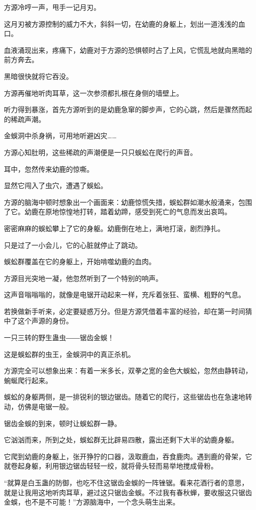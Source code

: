 \begin{this_body}
方源冷哼一声，甩手一记月刃。

这月刃被方源控制的威力不大，斜斜一切，在幼鹿的身躯上，划出一道浅浅的血口。

血液涌现出来，疼痛下，幼鹿对于方源的恐惧顿时占了上风，它慌乱地就向黑暗的前方奔去。

黑暗很快就将它吞没。

方源再催地听肉耳草，这一次参须都扎根在身侧的墙壁上。

听力得到暴涨，首先方源听到的是幼鹿急窜的脚步声，它的心跳，然后是骤然而起的稀疏声潮。

金蜈洞中杀身祸，可用地听避凶灾……

方源心知肚明，这些稀疏的声潮便是一只只蜈蚣在爬行的声音。

耳中，忽然传来幼鹿的惊嘶。

显然它闯入了虫穴，遭遇了蜈蚣。

方源的脑海中顿时想象出一个画面来：幼鹿惊慌失措，蜈蚣群如潮水般涌来，包围了它。幼鹿在原地惊惶地打转，踏着幼蹄，感受到死亡的气息而发出哀鸣。

密密麻麻的蜈蚣攀上了它的身躯。幼鹿倒在地上，满地打滚，剧烈挣扎。

只是过了一小会儿，它的心脏就停止了跳动。

蜈蚣群覆盖在它的身躯上，开始啃噬幼鹿的血肉。

方源目光突地一凝，他忽然听到了一个特别的响声。

这声音嗡嗡嗡的，就像是电锯开动起来一样，充斥着张狂、蛮横、粗野的气息。

若换做新手听来，必定要疑惑万分。但是方源凭借着丰富的经验，却在第一时间猜中了这个声源的身份。

一只三转的野生蛊虫――锯齿金蜈！

这是蜈蚣群的虫王，金蜈洞中的真正杀机。

方源完全可以想象出来：有着一米多长，双拳之宽的金色大蜈蚣，忽然由静转动，蜿蜒爬行起来。

蜈蚣的身躯两侧，是一排锐利的银边锯齿。随着它的爬行，这些锯齿也在急速地转动，仿佛是电锯一般。

锯齿金蜈的到来，顿时让蜈蚣群一静。

它汹汹而来，所到之处，蜈蚣群无比辟易四散，露出还剩下大半的幼鹿身躯。

它爬到幼鹿的身躯上，张开狰狞的口器，汲取鹿血，吞食鹿肉。遇到鹿的骨架，它就卷起身躯，利用银边锯齿轻轻一绞，就将骨头轻而易举地搅成骨粉。

“就算是白玉蛊的防御，也吃不住这锯齿金蜈的一阵锉锯。看来花酒行者的意思，就是让我用这地听肉耳草，避过这只锯齿金蜈。不过我有春秋蝉，要收服这只锯齿金蜈，也不是不可能！”方源脑海中，一个念头萌生出来。


\end{this_body}
